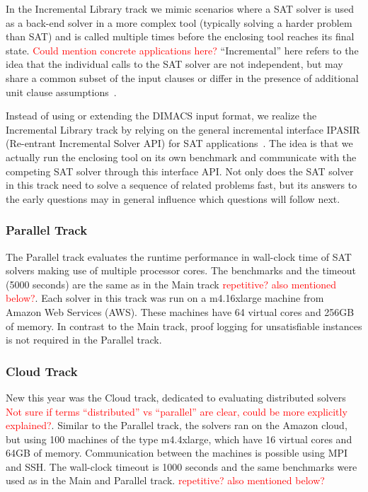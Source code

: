 \documentclass{elsarticle}
\begin{document}
In the Incremental Library track we mimic scenarios
where a SAT solver is used as a back-end solver in a more complex tool
(typically solving a harder problem than SAT) and is called multiple times before 
the enclosing tool reaches its final state. \textcolor{red}{Could mention concrete applications here?}
``Incremental'' here refers to the 
idea that
the individual calls to the SAT solver are not independent, but may share 
a common subset of the input clauses or differ in the presence of additional 
unit clause assumptions~\cite{Nadel:2014:Incremental,Fazekas:2019:IncrementalInprocessing}. 

Instead of using or extending the DIMACS input format, we realize the Incremental Library track
by relying on the general incremental interface IPASIR (Re-entrant Incremental Solver API) 
for SAT applications~\cite{Balyo:2015:SATRace}. The idea is that we actually run the 
enclosing tool on its own benchmark and communicate with the competing SAT solver 
through this interface API. 
%
Not only does the SAT solver in this track
need to solve a sequence of related problems fast, but its answers to the early questions
may in general influence which questions will follow next.

\subsubsection{Parallel Track}

The Parallel track evaluates the runtime performance in wall-clock time of SAT solvers making use of
 multiple processor cores.
The benchmarks and the timeout (5000 seconds) are the same as in the Main track \textcolor{red}{repetitive? also mentioned below?}. 
Each solver in this track was run on a m4.16xlarge machine from Amazon Web Services (AWS).
These machines have 64 virtual cores and 256GB of memory. In contrast to the 
Main track, proof logging for unsatisfiable instances is not required in the Parallel track. 

\subsubsection{Cloud Track}

New this year was the Cloud track, dedicated to evaluating distributed solvers \textcolor{red}{Not sure
if terms ``distributed'' vs ``parallel'' are clear, could be more explicitly explained?}. Similar to the
Parallel track, the solvers ran on the Amazon cloud, but using 100 machines of the
type m4.4xlarge, which have 16 virtual cores and 64GB of memory. 
Communication between the machines is possible using MPI and SSH.
The wall-clock timeout is 1000 seconds and the same benchmarks were used as in
the Main and Parallel track. \textcolor{red}{repetitive? also mentioned below?}
\end{document}
